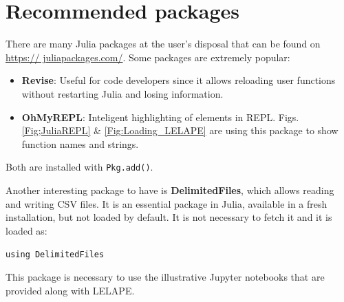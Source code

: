 \section{Recommended packages}
%
There are many Julia packages at the user's disposal that can be found on \href{https://juliapackages.com/}{https:// juliapackages.com/}. Some packages are extremely popular:
\begin{itemize}
	\item \textbf{Revise}: Useful for code developers since it allows reloading user functions without restarting Julia and losing information.
	\item \textbf{OhMyREPL}: Inteligent highlighting of elements in REPL. Figs. \ref{Fig;JuliaREPL} \& \ref{Fig:Loading_LELAPE} are using this package to show function names and strings.
\end{itemize}

Both are installed with \texttt{Pkg.add()}. 

Another interesting package to have is \textbf{DelimitedFiles}, which allows reading and writing CSV files. It is an essential package in Julia, available in a fresh installation, but not loaded by default. It is not necessary to fetch it and it is loaded as:
	
\vspace{1mm}
\begin{center}
	\texttt{using DelimitedFiles}
\end{center}
\vspace{1mm}	

This package is necessary to use the illustrative Jupyter notebooks that are provided along with LELAPE.

